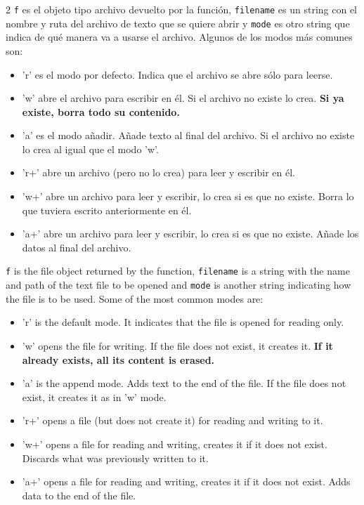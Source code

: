 \begin{paracol}{2}
    \texttt{f} es el objeto tipo archivo devuelto por la función, \texttt{filename} es un string con el nombre y ruta del archivo de texto que se quiere abrir y \texttt{mode} es otro string que indica de qué manera va a usarse el archivo. Algunos de los modos más comunes son:
    \begin{itemize}
        \item 'r' es el modo por defecto. Indica que el archivo se abre sólo para leerse.
        \item 'w' abre el archivo para escribir en él. Si el archivo no existe lo crea. \textbf{Si ya existe, borra todo su contenido.}
        \item 'a' es el modo añadir. Añade texto al final del archivo. Si el archivo no existe lo crea al igual que el modo 'w'.
        \item 'r+' abre un archivo (pero no lo crea) para leer y escribir en él.
        \item 'w+' abre un archivo para leer y escribir, lo crea si es que no existe. Borra lo que tuviera escrito anteriormente en él.
        \item 'a+'  abre un archivo para leer y escribir, lo crea si es que no existe. Añade los datos al final del archivo.
    \end{itemize}
    \switchcolumn
    \texttt{f} is the file object returned by the function, \texttt{filename} is a string with the name and path of the text file to be opened and \texttt{mode} is another string indicating how the file is to be used. Some of the most common modes are:
    \begin{itemize}
        \item 'r' is the default mode. It indicates that the file is opened for reading only.
        \item 'w' opens the file for writing. If the file does not exist, it creates it. \textbf{If it already exists, all its content is erased.}
        \item 'a' is the append mode. Adds text to the end of the file. If the file does not exist, it creates it as in 'w' mode.
        \item 'r+' opens a file (but does not create it) for reading and writing to it.
        \item 'w+' opens a file for reading and writing, creates it if it does not exist. Discards what was previously written to it.
        \item 'a+' opens a file for reading and writing, creates it if it does not exist. Adds data to the end of the file.
    \end{itemize}


\end{paracol}
